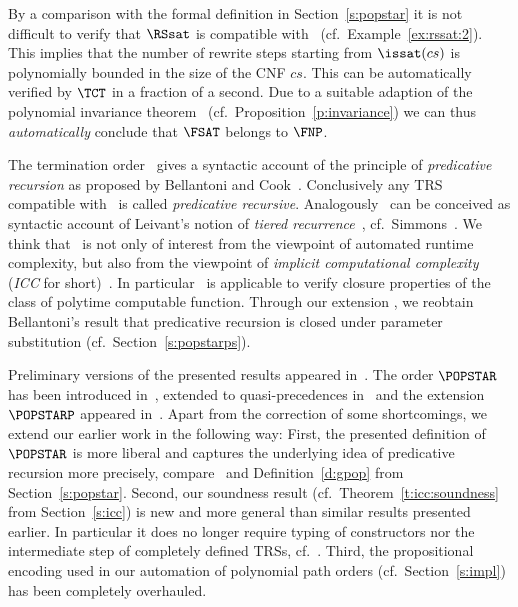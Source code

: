 \documentclass{LMCS}
\begin{document}
\noindent By a comparison with the formal definition in Section~\ref{s:popstar} it
is not difficult to verify that $\RSsat$ is compatible with \POPSTAR\
(cf.~Example~\ref{ex:rssat:2}).
This implies that the number of rewrite steps starting from $\issat(cs)$ 
is polynomially bounded in the size of the CNF $cs$. 
This can be automatically verified by $\TCT$ in a fraction of a second.
Due to a suitable adaption of the polynomial invariance theorem~\cite{AM10b}
(cf.~Proposition~\ref{p:invariance})
we can thus \emph{automatically} conclude that $\FSAT$ belongs to $\FNP$.

The termination order \POPSTAR\ gives 
a syntactic account of the principle of \emph{predicative recursion} as proposed 
by Bellantoni and Cook~\cite{BC92}. 
Conclusively any TRS compatible with \POPSTAR\
is called \emph{predicative recursive}.
Analogously \POPSTAR\ can be 
conceived as syntactic account of Leivant's notion of \emph{tiered recurrence}~\cite{Leivant:1990,L91,Leivant93}, cf.~Simmons~\cite{Simmons:1988}. 
We think that \POPSTAR\ is not only of interest from the
viewpoint of automated runtime complexity, but also from the 
viewpoint of \emph{implicit computational complexity} (\emph{ICC} for
short)~\cite{BMR09,DalLago:2011}. In particular \POPSTAR\ is
applicable to verify closure properties of the class of polytime computable function.
Through our extension \POPSTARP, we reobtain Bellantoni's result that predicative
recursion is closed under parameter substitution (cf.~Section~\ref{s:popstarps}).

Preliminary versions of the presented results appeared in~\cite{AM08,AMS08,AM09b}.
The order $\POPSTAR$ has been introduced in~\cite{AM08}, extended to
quasi-precedences in~\cite{AMS08} and the extension $\POPSTARP$
appeared in~\cite{AM09b}.
Apart from the correction of some shortcomings, we extend our earlier work
in the following way:
First, the presented definition of $\POPSTAR$ is more liberal and 
captures the underlying idea of predicative recursion more precisely, 
compare~\cite[Definition~4]{AM08} and Definition~\ref{d:gpop} from Section~\ref{s:popstar}.
Second, our soundness result (cf.~Theorem~\ref{t:icc:soundness} from Section~\ref{s:icc}) 
is new and more general than similar results presented earlier. In particular
it does no longer require typing of constructors nor the intermediate
step of completely defined TRSs, cf.~\cite{AM08}.
Third, the propositional encoding used in our automation of polynomial path orders 
(cf.~Section~\ref{s:impl}) has been completely overhauled.
\end{document}
